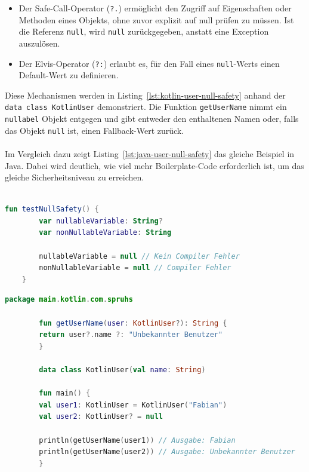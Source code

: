 \documentclass[11pt]{article}
\begin{document}
    \begin{itemize}

        \item
            Der Safe-Call-Operator (\texttt{?.}) ermöglicht den Zugriff auf Eigenschaften oder Methoden eines Objekts, ohne zuvor explizit auf null prüfen zu müssen.
            Ist die Referenz \texttt{null}, wird \texttt{null} zurückgegeben, anstatt eine Exception auszulösen.
        \item
            Der Elvis-Operator (\texttt{?:}) erlaubt es, für den Fall eines \texttt{null}-Werts einen Default-Wert zu definieren.
    \end{itemize}

    Diese Mechanismen werden in Listing~\ref{lst:kotlin-user-null-safety} anhand der \texttt{data class KotlinUser} demonstriert.
    Die Funktion \texttt{getUserName} nimmt ein \texttt{nullabel} Objekt entgegen und gibt entweder den enthaltenen Namen oder, falls das Objekt \texttt{null} ist, einen Fallback-Wert zurück.\\
    \\
    Im Vergleich dazu zeigt Listing~\ref{lst:java-user-null-safety} das gleiche Beispiel in Java.
    Dabei wird deutlich, wie viel mehr Boilerplate-Code erforderlich ist, um das gleiche Sicherheitsniveau zu erreichen.\\
    \\

    \begin{lstlisting}[language=Kotlin, caption={KotlinNullSafety.kt}, label={lst:kotlin-null-safety}]
    fun testNullSafety() {
        var nullableVariable: String?
        var nonNullableVariable: String

        nullableVariable = null // Kein Compiler Fehler
        nonNullableVariable = null // Compiler Fehler
    }
    \end{lstlisting}

    \begin{lstlisting}[language=Kotlin, caption={KotlinUser.kt}, label={lst:kotlin-user-null-safety}]
        package main.kotlin.com.spruhs

        fun getUserName(user: KotlinUser?): String {
        return user?.name ?: "Unbekannter Benutzer"
        }

        data class KotlinUser(val name: String)

        fun main() {
        val user1: KotlinUser = KotlinUser("Fabian")
        val user2: KotlinUser? = null

        println(getUserName(user1)) // Ausgabe: Fabian
        println(getUserName(user2)) // Ausgabe: Unbekannter Benutzer
        }
    \end{lstlisting}
\end{document}
